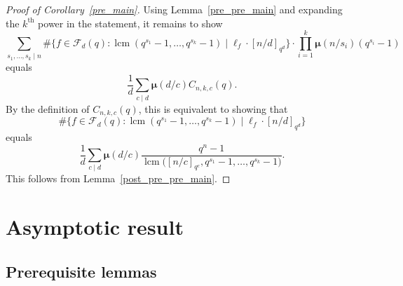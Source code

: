 \documentclass[Unicode,ALCO]{cedram}
\DeclareMathOperator{\lcm}{lcm}
\newcommand{\CF}{\mathcal{F}}
\newcommand{\moebius}{\pmb{\mu}}
\begin{document}
\begin{proof}[Proof of Corollary~\ref{pre_main}]
Using Lemma~\ref{pre_pre_main} and expanding the \(k^\text{th}\) power in the statement, it remains to show
\[
\sum_{s_1,\ldots,s_k \mid n}
\# \{f \in \CF_d (q) : \lcm(q^{s_1}-1,\ldots,q^{s_k}-1) \mid \ell_f \cdot [n/d]_{q^d}\}
\cdot
\prod_{i=1}^k \moebius(n/s_i)(q^{s_i}-1)
\]
equals
\[
\frac{1}{d} \sum_{c \mid d} \moebius(d/c) C_{n,k,c} (q).
\]
By the definition of \(C_{n,k,c} (q)\),
this is equivalent to showing that
\[
\# \{f \in \CF_d (q) : \lcm(q^{s_1}-1,\ldots,q^{s_k}-1) \mid \ell_f \cdot [n/d]_{q^d} \}
\]
equals
\[
\frac{1}{d}
\sum_{c \mid d}
\moebius(d/c)
\frac{q^n-1}{\lcm \big ( [n/c]_{q^c}, q^{s_1}-1, \ldots, q^{s_k}-1 \big )}.
\]
This follows from Lemma~\ref{post_pre_pre_main}.
\end{proof}






































\section{Asymptotic result}
\label{probabilistic_section}








\subsection{Prerequisite lemmas}
\end{document}

